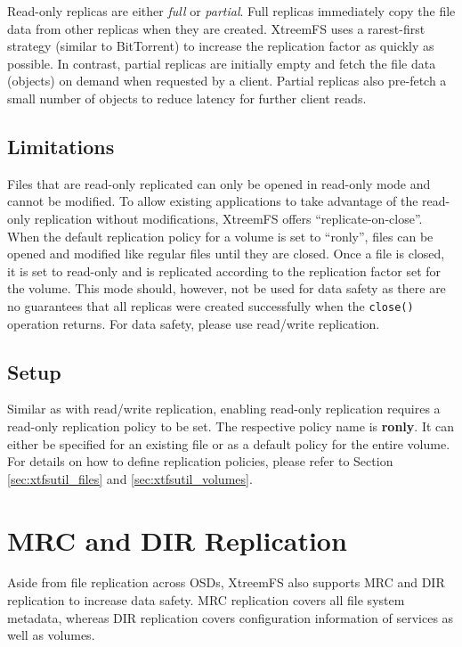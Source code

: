 \documentclass[a4paper,10pt]{book}
\begin{document}
Read-only replicas are either \textit{full} or \textit{partial}. Full replicas immediately copy the file data from other replicas when they are created. XtreemFS uses a rarest-first strategy (similar to BitTorrent) to increase the replication factor as quickly as possible. In contrast, partial replicas are initially empty and fetch the file data (objects) on demand when requested by a client. Partial replicas also pre-fetch a small number of objects to reduce latency for further client reads.

\subsection{Limitations}
Files that are read-only replicated can only be opened in read-only mode and cannot be modified. To allow existing applications to take advantage of the read-only replication without modifications, XtreemFS offers ``replicate-on-close''. When the default replication policy for a volume is set to ``ronly'', files can be opened and modified like regular files until they are closed. Once a file is closed, it is set to read-only and is replicated according to the replication factor set for the volume. This mode should, however, not be used for data safety as there are no guarantees that all replicas were created successfully when the \texttt{close()} operation returns. For data safety, please use read/write replication.

\subsection{Setup}
Similar as with read/write replication, enabling read-only replication requires a read-only replication policy to be set. The respective policy name is \textbf{ronly}. It can either be specified for an existing file or as a default policy for the entire volume. For details on how to define replication policies, please refer to Section \ref{sec:xtfsutil_files} and \ref{sec:xtfsutil_volumes}.


\section{MRC and DIR Replication}
Aside from file replication across OSDs, XtreemFS also supports MRC and DIR replication to increase data safety. MRC replication covers all file system metadata, whereas DIR replication covers configuration information of services as well as volumes.
\end{document}
